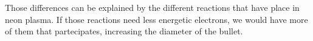 Those differences can be explained by the different reactions that have place in neon plasma. If those reactions need less energetic electrons, we would have more of them that partecipates, increasing the diameter of the bullet.
\begin{figure}
 \centering
 \hfill
 
 \hfill
 

\end{figure}
